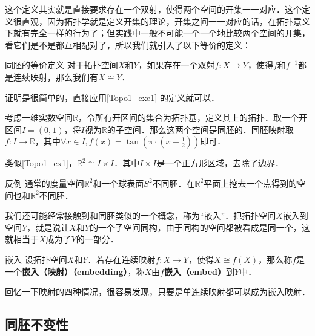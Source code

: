 这个定义其实就是直接要求存在一个双射，使得两个空间的开集一一对应．这个定义很直观，因为拓扑学就是定义开集的理论，开集之间一一对应的话，在拓扑意义下就有完全一样的行为了；但实践中一般不可能一个一个地比较两个空间的开集，看它们是不是都互相配对了，所以我们就引入了以下等价的定义：

\begin{theorem}{同胚的等价定义}\label{Topo1_the1}
对于拓扑空间$X$和$Y$，如果存在一个双射$f:X\rightarrow Y$，使得$f$和$f^{-1}$都是连续映射，那么我们有$X\cong Y$．
\end{theorem}

证明是很简单的，直接应用\autoref{Topo1_exe1} 的定义就可以．

\begin{example}{}\label{Topo1_ex1}
考虑一维实数空间$\mathbb{R}$，令所有开区间的集合为拓扑基，定义其上的拓扑．取一个开区间$I=(0, 1)$，将$I$视为$\mathbb{R}$的子空间．那么这两个空间是同胚的．同胚映射取$f:I\rightarrow\mathbb{R}$，其中$\forall x\in I, f(x)=\tan{(\pi\cdot(x-\frac{1}{2}))}$即可．
\end{example}

\begin{example}{}\label{Topo1_ex2}
类似\autoref{Topo1_ex1}，$\mathbb{R}^2\cong I\times I$．其中$I\times I$是一个正方形区域，去除了边界．
\end{example}

\begin{example}{反例}\label{Topo1_ex3}
通常的度量空间$\mathbb{R}^2$和一个球表面$S^2$不同胚．在$\mathbb{R}^2$平面上挖去一个点得到的空间也和$\mathbb{R}^2$不同胚．
\end{example}

我们还可能经常接触到和同胚类似的一个概念，称为“嵌入”．把拓扑空间$X$嵌入到空间$Y$，就是说让$X$和$Y$的一个子空间同构，由于同构的空间都被看成是同一个，这就相当于$X$成为了$Y$的一部分．

\begin{definition}{嵌入}
设拓扑空间$X$和$Y$．若存在连续映射$f:X\rightarrow Y$，使得$X\cong f(X)$，那么称$f$是一个\textbf{嵌入（映射）（embedding）}，称$X$由$f$\textbf{嵌入（embed）}到$Y$中．
\end{definition}

回忆一下映射的四种情况，很容易发现，只要是单连续映射都可以成为嵌入映射．

\subsection{同胚不变性}

